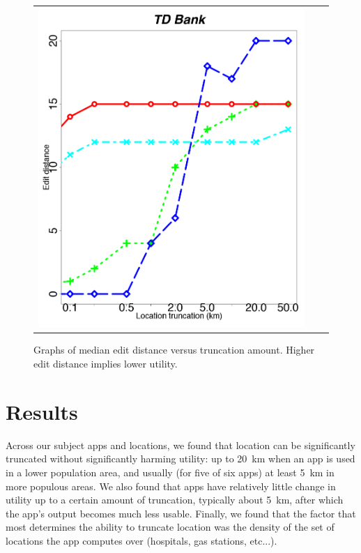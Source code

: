 \documentclass[10pt, conference, compsocconf]{IEEEtran}
\begin{document}
{\begin{figure}[t!]
\begin{tabular}{ccc}
    \begin{minipage}{2in}
      \includegraphics[width=\textwidth]
                      {data/tdbank/plots/medians_across_city_20}
    \end{minipage}
  \end{tabular}
  \caption{Graphs of median edit distance versus truncation
    amount. Higher edit distance implies lower utility.}
  \label{fig:edit-distance-metric}
\end{figure}

\section{Results}
\label{sec:results}

Across our
subject apps and locations, we found that location can be
significantly truncated without significantly harming utility: up to 20~km
when an app is used in a lower population area, and usually (for five of six apps) 
at least 5~km in more populous areas.  We also found that apps have relatively little 
change in utility up to a certain amount of truncation, typically
about 5~km, after 
which the app's output becomes much less usable.  Finally, we found that the factor 
that most determines the ability to truncate location was the density
of the set of locations the app computes over (hospitals, gas stations, etc...).

}
\end{document}
